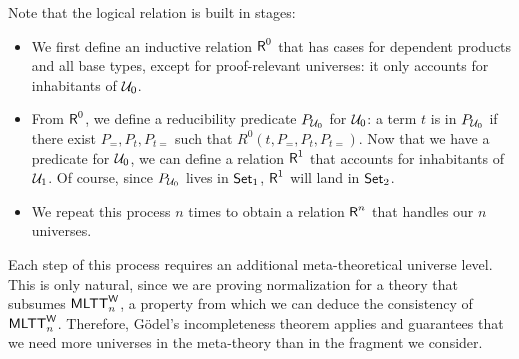 Note that the logical relation is built in stages:
\begin{itemize}
\item We first define an inductive relation
  \( \AgdaData{R}^0 \) that has cases for dependent products and all base types, except
  for proof-relevant universes: it only accounts for inhabitants of
  \( \mathcal{U}_0 \).
\item From \( \AgdaData{R}^0 \), we define a reducibility predicate \( P_{\mathcal{U}_0} \) for
  \( \mathcal{U}_0 \): a term \( t \) is in \( P_{\mathcal{U}_0} \) if there exist
  \( P_=, P_t, P_{t=} \) such that \( R^0(t,P_=, P_t, P_{t=}) \).
  Now that we have a predicate for \( \mathcal{U}_0 \), we can define a relation
  \( \AgdaData{R}^1 \) that accounts for inhabitants of \( \mathcal{U}_1 \). Of course, since
  \( P_{\mathcal{U}_0} \) lives in \( \AgdaSet{1} \), \( \AgdaData{R}^1 \) will land in \( \AgdaSet{2} \).
\item We repeat this process \( n \) times to obtain a relation \( \AgdaData{R}^n \)
  that handles our \( n \) universes.
\end{itemize}
Each step of this process requires an additional meta-theoretical universe
level.
%
This is only natural, since we are proving normalization for a theory that
subsumes \( \mathsf{MLTT}^\mathsf{W}_n \), a property from which we can deduce the consistency
of \( \mathsf{MLTT}^\mathsf{W}_n \).
%
Therefore, Gödel's incompleteness theorem applies and guarantees that
we need more universes in the meta-theory than in the fragment we
consider.


